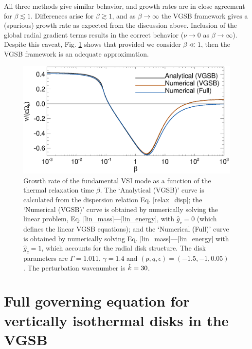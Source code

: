 All three methods give similar behavior, and growth rates are in close
agreement for $\beta\lesssim 1$. Differences arise for 
$\beta\gtrsim1$, and as $\beta\to\infty$ the VGSB framework gives a
(spurious) growth rate as expected from the discussion
above. Inclusion of the global radial gradient terms results in the
correct behavior  ($\nu\to0$ as $\beta\to\infty$). Despite this
caveat, Fig. \ref{gcorr_compare} shows that provided we consider
$\beta\ll1$, then the VGSB framework is an adequate approximation. 
 
\begin{figure}
  \includegraphics[width=\linewidth,clip=true,trim=0cm 0.0cm 0cm
  0cm]{figures/gcorr_compare} 
  \caption{Growth rate of the fundamental VSI mode as a function of
    the thermal relaxation time $\beta$. The `Analytical (VGSB)' curve
    is calculated from the dispersion relation Eq. \ref{relax_disp};
    the `Numerical (VGSB)' curve is obtained by numerically solving
    the linear problem, Eq. \ref{lin_mass}---\ref{lin_energy}, with $\hat{g}_c=0$
    (which defines the linear VGSB equations); and the `Numerical
    (Full)' curve is obtained by numerically solving 
    Eq. \ref{lin_mass}---\ref{lin_energy}  with $\hat{g}_c=1$, which
    accounts for the radial disk structure.  
    The disk parameters are $\Gamma=1.011$,
    $\gamma=1.4$ and $(p,q,\epsilon)=(-1.5,-1,0.05)$. The perturbation
    wavenumber is $\hat{k}=30$. 
    \label{gcorr_compare}}  
\end{figure}






\section{Full governing equation for vertically isothermal disks in
  the VGSB}\label{adia_improve}

